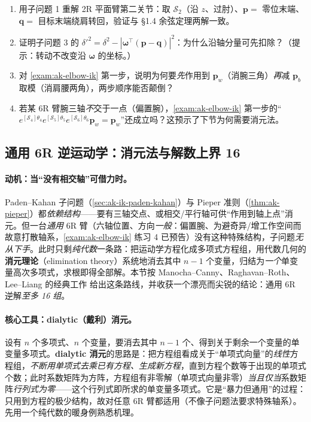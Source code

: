 \begin{practice}
\begin{enumerate}
  \item 用子问题 1 重解 2R 平面臂第二关节：取 $\mathcal{S}_2$（沿 $z$、过肘）、$\mathbf{p}=$ 零位末端、$\mathbf{q}=$ 目标末端绕肩转回，验证与 §1.4 余弦定理两解一致。
  \item 证明子问题 3 的 $\delta'^2=\delta^2-|\boldsymbol{\omega}^\top(\mathbf{p}-\mathbf{q})|^2$：为什么沿轴分量可先扣除？（提示：转动不改变沿 $\boldsymbol{\omega}$ 的坐标。）
  \item 对 \cref{exam:ak-elbow-ik} 第一步，说明为何要\emph{先}作用到 $\mathbf{p}_w$（消腕三角）\emph{再}减 $\mathbf{p}_b$ 取模（消肩腰两角），两步顺序能否颠倒？
  \item 若某 6R 臂腕三轴\emph{不}交于一点（偏置腕），\cref{exam:ak-elbow-ik} 第一步的“$e^{[\mathcal{S}_4]\theta_4}e^{[\mathcal{S}_5]\theta_5}e^{[\mathcal{S}_6]\theta_6}\mathbf{p}_w=\mathbf{p}_w$”还成立吗？这预示了下节为何需要消元法。
\end{enumerate}
\end{practice}

\subsection{通用 6R 逆运动学：消元法与解数上界 16}
\label{sec:ak-ik-elimination}

\paragraph{动机：当“没有相交轴”可借力时。}
Paden--Kahan 子问题（\cref{sec:ak-ik-paden-kahan}）与 Pieper 准则（\cref{thm:ak-pieper}）都\emph{依赖结构}——要有三轴交点、或相交/平行轴可供“作用到轴上点”消元。但一台\emph{通用} 6R 臂（六轴位置、方向\emph{一般}：偏置腕、为避奇异/增工作空间而故意打散轴系，\cref{exam:ak-elbow-ik} 练习 4 已预告）没有这种特殊结构，子问题\emph{无从下手}。此时只剩\emph{纯代数}一条路：把运动学方程化成多项式方程组，用代数几何的\textbf{消元理论}（elimination theory）系统地消去其中 $n-1$ 个变量，归结为\emph{一个}单变量高次多项式，求根即得全部解。本节按 Manocha--Canny、Raghavan--Roth、Lee--Liang 的经典工作\cite{manocha1994realtime,raghavan1993inverse,lee1988displacement,murray1994mathematical} 给出这条路线，并收获一个漂亮而尖锐的结论：通用 6R 逆解\emph{至多 16 组}。

\paragraph{核心工具：dialytic（戴利）消元。}
设有 $n$ 个多项式、$n$ 个变量，要消去其中 $n-1$ 个、得到关于剩余一个变量的单变量多项式。\textbf{dialytic 消元}的思路是：把方程组看成关于“单项式向量”的\emph{线性}方程组，\emph{不断用单项式去乘已有方程、生成新方程}，直到方程个数等于出现的单项式个数；此时系数矩阵为方阵，方程组有非零解（单项式向量非零）\emph{当且仅当}系数矩阵\emph{行列式为零}——这个行列式即所求的单变量多项式。它是“暴力但通用”的过程：只用到方程的极少结构，故对任意 6R 臂都适用（不像子问题法要求特殊轴系）。先用一个纯代数的暖身例熟悉机理。

